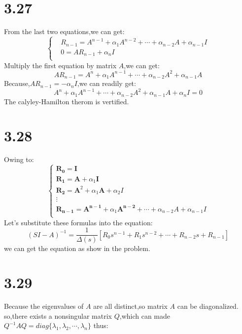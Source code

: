 \documentclass{article}
\begin{document}
\section*{3.27}
From the last two equations,we can get:
\[
\left\{    
\begin{array}{ll}
&R_{n-1}=A^{n-1}+\alpha_1A^{n-2}+\cdots+\alpha_{n-2}A+\alpha_{n-1}I\\
&0=AR_{n-1}+\alpha_{n}I\\
\end{array}
\right.
\]
Multiply the first equation by matrix $A$,we can get:
\[AR_{n-1}=A^{n}+\alpha_1A^{n-1}+\cdots+\alpha_{n-2}A^2+\alpha_{n-1}A\]
Because,$AR_{n-1}=-\alpha_nI$,we can readily get:
\[A^{n}+\alpha_1A^{n-1}+\cdots+\alpha_{n-2}A^2+\alpha_{n-1}A+\alpha_nI=0\]
The calyley-Hamilton therom is vertified.\\

\section*{3.28}
Owing to:
\[
\left\{
\begin{array}{ll}
\boldsymbol{R_0}=\boldsymbol{I}\\
\boldsymbol{R_1}=\boldsymbol{A}+\alpha_1\boldsymbol{I}\\
\boldsymbol{R_2}=\boldsymbol{A}^2+\alpha_1\boldsymbol{A}+\alpha_2I\\
\boldsymbol{\vdots}\\
\boldsymbol{R_{n-1}}=\boldsymbol{A^{n-1}}+\alpha_{1}\boldsymbol{A^{n-2}}+\cdots+\alpha_{n-2}A+\alpha_{n-1}I\\
\end{array}\right.
\]
Let's substitute these formulas into the equation:\\
\[(SI-A)^{-1}=\frac{1}{\Delta(s)}[R_0s^{n-1}+R_1s^{n-2}+\cdots+R_{n-2}s+R_{n-1}]\]
we can get the equation as show in the problem.\\

\section*{3.29}
Because the eigenvalues of $A$ are all distinct,so matrix $A$ can be diagonalized.
so,there exists a nonsingular matrix $Q$,which can made $Q^{-1}AQ=diag\{\lambda_1,\lambda_2,\cdots,\lambda_n\}$
thus:
\[\]
\end{document}
